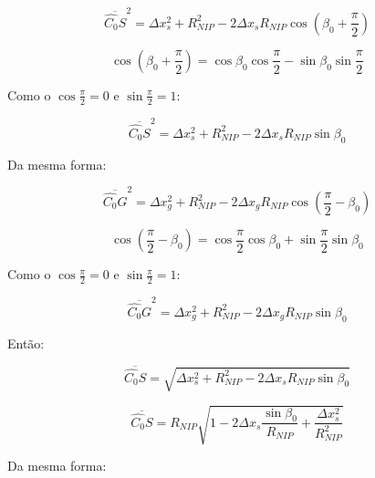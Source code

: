\begin{equation}
 \label{eq:ap:1.10}
 \overline{\hat{C_0}S}^2 = \Delta x_{s}^2 + R_{NIP}^2 - 2 \Delta x_s R_{NIP} 
 \cos{ \left( \beta_0 + \frac{\pi}{2} \right) }
\end{equation}

\begin{equation}
 \label{eq:ap:1.11}
 \cos{\left( \beta_0 + \frac{\pi}{2} \right)} 
 = \cos{\beta_0} \cos{\frac{\pi}{2}} - \sin{\beta_0} \sin{\frac{\pi}{2}}
\end{equation}

Como o $\cos{\frac{\pi}{2}}=0$ e $\sin{\frac{\pi}{2}}=1$:

\begin{equation}
 \label{eq:ap:1.12}
 \overline{\hat{C_0}S}^2 = \Delta x_{s}^2 + R_{NIP}^2 - 2 \Delta x_s R_{NIP} \sin{\beta_0}
\end{equation}

Da mesma forma:

\begin{equation}
 \label{eq:ap:1.13}
 \overline{\hat{C_0}G}^2 = \Delta x_{g}^2 + R_{NIP}^2 - 2 \Delta x_g R_{NIP} 
 \cos{\left( \frac{\pi}{2} - \beta_0 \right) }
\end{equation}

\begin{equation}
 \label{eq:ap:1.14}
 \cos{\left( \frac{\pi}{2} - \beta_0 \right)} 
 = \cos{\frac{\pi}{2}} \cos{\beta_0} + \sin{\frac{\pi}{2}} \sin{\beta_0}
\end{equation}

Como o $\cos{\frac{\pi}{2}}=0$ e $\sin{\frac{\pi}{2}}=1$:

\begin{equation}
 \label{eq:ap:1.15}
 \overline{\hat{C_0}G}^2 = \Delta x_{g}^2 + R_{NIP}^2 - 2 \Delta x_g R_{NIP} \sin{\beta_0}
\end{equation}

Então:

\begin{equation}
 \label{eq:ap:1.16}
 \overline{\hat{C_0}S} = \sqrt{ \Delta x_{s}^2 + R_{NIP}^2 - 2 \Delta x_s R_{NIP} \sin{\beta_0} }
\end{equation}

\begin{equation}
 \label{eq:ap:1.17}
 \overline{\hat{C_0}S} = 
 R_{NIP} \sqrt{  1 - 2 \Delta x_s \frac{\sin{\beta_0}}{R_{NIP}} + \frac{\Delta x_{s}^2}{R_{NIP}^2} }
\end{equation}

Da mesma forma:

